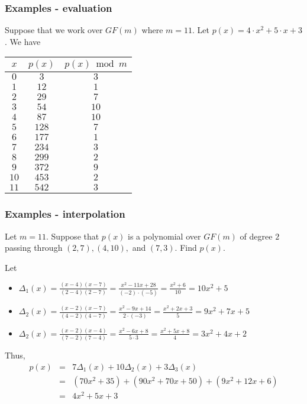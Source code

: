 \begin{frame}
  \frametitle{Examples - evaluation}

  Suppose that we work over $GF(m)$ where $m=11$.  Let $p(x) = 4\cdot
  x^2 + 5\cdot x + 3$.  We have

  {\small
  \begin{tabular}{c|c|c}
    $x$ & $p(x)$ & $p(x)\bmod m$ \\
    \hline
    $0$ & $3$ & $3$ \\
    $1$ & $12$ & $1$ \\
    $2$ & $29$ & $7$ \\
    $3$ & $54$ & $10$ \\
    $4$ & $87$ & $10$ \\
    $5$ & $128$ & $7$ \\
    $6$ & $177$ & $1$ \\
    $7$ & $234$ & $3$ \\
    $8$ & $299$ & $2$ \\
    $9$ & $372$ & $9$ \\
    $10$ & $453$ & $2$ \\
    $11$ & $542$ & $3$ \\
  \end{tabular}
  }
\end{frame}

\begin{frame}
  \frametitle{Examples - interpolation}

  Let $m=11$. Suppose that $p(x)$ is a polynomial over $GF(m)$ of
  degree $2$ passing through $(2,7),(4,10),$ and $(7,3)$.  Find $p(x)$.

  Let
  \begin{itemize}
  \item
    $\Delta_1(x)=\frac{(x-4)(x-7)}{(2-4)(2-7)}
    =\frac{x^2-11x+28}{(-2)\cdot(-5)}
    =\frac{x^2+6}{10}
    =10x^2+5$
  \item
    $\Delta_2(x)=\frac{(x-2)(x-7)}{(4-2)(4-7)}
    =\frac{x^2-9x+14}{2\cdot(-3)}
    =\frac{x^2+2x+3}{5}
    =9x^2+7x+5$
  \item
    $\Delta_2(x)=\frac{(x-2)(x-4)}{(7-2)(7-4)}
    =\frac{x^2-6x+8}{5\cdot 3}
    =\frac{x^2+5x+8}{4}
    =3x^2+4x+2$
  \end{itemize}

  Thus,
  \begin{eqnarray*}
    p(x) &=&  7\Delta_1(x) + 10\Delta_2(x) + 3\Delta_3(x) \\
    &=& (70x^2 + 35) + (90x^2 + 70x+50) + (9x^2+12x+6) \\
    &=& 4x^2+5x+3
  \end{eqnarray*}
\end{frame}

